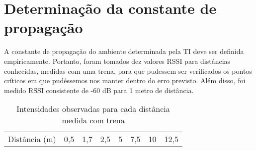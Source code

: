 \chapter{Determinação da constante de propagação}

A constante de propagação do ambiente determinada pela TI deve ser definida empiricamente. Portanto, foram tomados dez valores RSSI para distâncias conhecidas, medidas com uma trena, para que pudessem ser verificados os pontos críticos em que pudéssemos nos manter dentro do erro previsto. Além disso, foi medido RSSI consistente de -60 dB para 1 metro de distância.

\begin{table}[ht]
\centering
\caption{Intensidades observadas para cada distância medida com trena}
\vspace{0.5cm}
\begin{tabular}{l|ccccccc}
\hline
Distância (m) & 0,5 & 1,7 & 2,5 & 5 & 7,5 & 10 & 12,5 \vspace{0.4cm}\\


\end{tabular}
\end{table}
